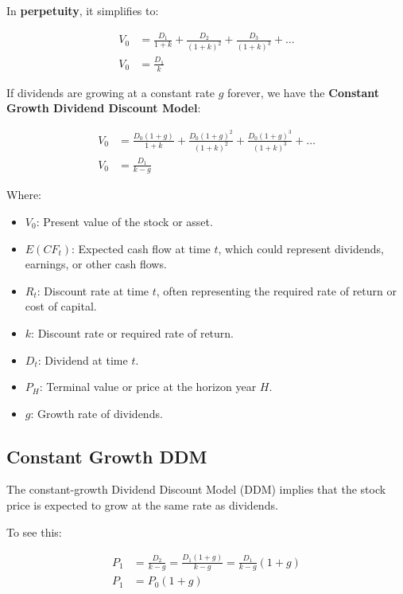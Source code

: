 \documentclass[
]{book}
\providecommand{\tightlist}{%
  \setlength{\itemsep}{0pt}\setlength{\parskip}{0pt}}
\begin{document}
In \textbf{perpetuity}, it simplifies to:

\[
\begin{align*}
V_0 &= \frac{D_1}{1+k} + \frac{D_2}{(1+k)^2} + \frac{D_3}{(1+k)^3} + \ldots \\
V_0 &= \frac{D_1}{k}
\end{align*}
\]

If dividends are growing at a constant rate \(g\) forever, we have the \textbf{Constant Growth Dividend Discount Model}:

\[
\begin{align*}
V_0 &= \frac{D_0 (1+g)}{1+k} + \frac{D_0 (1+g)^2}{(1+k)^2} + \frac{D_0 (1+g)^3}{(1+k)^3} + \ldots \\
V_0 &= \frac{D_1}{k-g}
\end{align*}
\]

Where:

\begin{itemize}
\tightlist
\item
  \(V_0\): Present value of the stock or asset.
\item
  \(E(CF_t)\): Expected cash flow at time \(t\), which could represent dividends, earnings, or other cash flows.
\item
  \(R_t\): Discount rate at time \(t\), often representing the required rate of return or cost of capital.
\item
  \(k\): Discount rate or required rate of return.
\item
  \(D_t\): Dividend at time \(t\).
\item
  \(P_H\): Terminal value or price at the horizon year \(H\).
\item
  \(g\): Growth rate of dividends.
\end{itemize}

\hypertarget{constant-growth-ddm}{%
\subsection{Constant Growth DDM}\label{constant-growth-ddm}}

The constant-growth Dividend Discount Model (DDM) implies that the stock price is expected to grow at the same rate as dividends.

To see this:

\[
\begin{align*}
P_1 &= \frac{D_2}{k - g} 
    = \frac{D_1 (1 + g)}{k - g} 
    = \frac{D_1}{k - g} (1 + g) \\
P_1     &= P_0 (1 + g)
\end{align*}
\]
\end{document}
